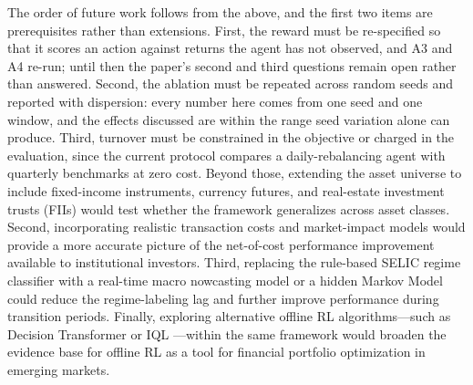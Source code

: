 The order of future work follows from the above, and the first two items are
prerequisites rather than extensions.
First, the reward must be re-specified so that it scores an action against returns
the agent has not observed, and A3 and A4 re-run; until then the paper's second and
third questions remain open rather than answered.
Second, the ablation must be repeated across random seeds and reported with
dispersion: every number here comes from one seed and one window, and the effects
discussed are within the range seed variation alone can produce.
Third, turnover must be constrained in the objective or charged in the evaluation,
since the current protocol compares a daily-rebalancing agent with quarterly
benchmarks at zero cost.
Beyond those, extending the asset universe to include fixed-income instruments,
currency futures, and real-estate investment trusts (FIIs) would test whether the
framework generalizes across asset classes.
Second, incorporating realistic transaction costs and market-impact models would
provide a more accurate picture of the net-of-cost performance improvement
available to institutional investors.
Third, replacing the rule-based SELIC regime classifier with a real-time macro
nowcasting model or a hidden Markov Model could reduce the regime-labeling lag
and further improve performance during transition periods.
Finally, exploring alternative offline RL algorithms---such as Decision Transformer
\citep{Chen2021} or IQL \citep{Kostrikov2021}---within the same framework would
broaden the evidence base for offline RL as a tool for financial portfolio
optimization in emerging markets.
